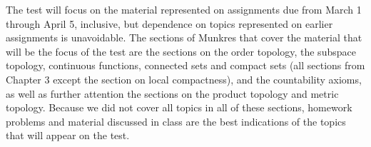 \documentclass{amsart}
\theoremstyle{plain}
\theoremstyle{definition}
\theoremstyle{remark}
\begin{document}
The test will focus on the material represented on assignments due from March 1 through April 5, inclusive, but dependence on topics represented on earlier assignments is unavoidable.  The sections of Munkres that cover the material that will be the focus of the test are the sections on the order topology, the subspace topology, continuous functions, connected sets and compact sets (all sections from Chapter 3 except the section on local compactness), and the countability axioms, as well as further attention the sections on the product topology and metric topology. Because we did not cover all topics in all of these sections, homework problems and material discussed in class are the best indications of the topics that will appear on the test. 




 
\end{document}
